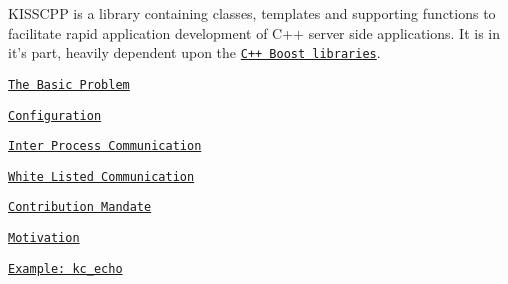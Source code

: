 K\-I\-S\-S\-C\-P\-P is a library containing classes, templates and supporting functions to facilitate rapid application development of C++ server side applications. It is in it's part, heavily dependent upon the \href{http://boost.org}{\tt C++ Boost libraries}.


\begin{DoxyItemize}
\item \href{md_the_basic_problem.html}{\tt The Basic Problem}
\item \href{md_configuration.html}{\tt Configuration}
\item \href{md_inter_process_communication.html}{\tt Inter Process Communication}
\begin{DoxyItemize}
\item \href{md_white_listed_communications.html}{\tt White Listed Communication}
\end{DoxyItemize}
\item \href{md_mandate.html}{\tt Contribution Mandate}
\item \href{md_motivation.html}{\tt Motivation}
\item \href{md_example_echo.html}{\tt Example\-: kc\-\_\-echo} 
\end{DoxyItemize}